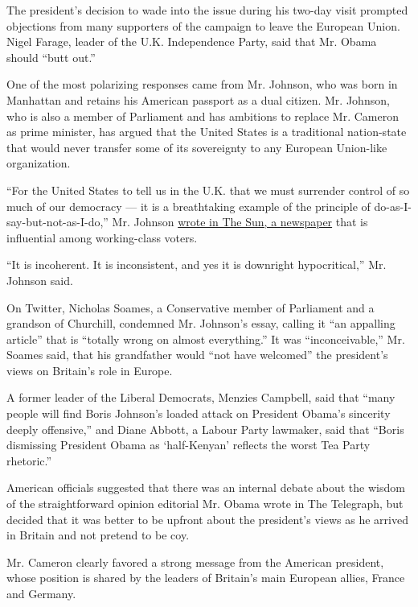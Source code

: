 The president's decision to wade into the issue during his two-day visit
prompted objections from many supporters of the campaign to leave the
European Union. Nigel Farage, leader of the U.K. Independence Party,
said that Mr. Obama should ``butt out.''

One of the most polarizing responses came from Mr. Johnson, who was born
in Manhattan and retains his American passport as a dual citizen. Mr.
Johnson, who is also a member of Parliament and has ambitions to replace
Mr. Cameron as prime minister, has argued that the United States is a
traditional nation-state that would never transfer some of its
sovereignty to any European Union-like organization.

``For the United States to tell us in the U.K. that we must surrender
control of so much of our democracy --- it is a breathtaking example of
the principle of do-as-I-say-but-not-as-I-do,'' Mr. Johnson
\href{http://www.thesun.co.uk/sol/homepage/news/politics/7095695/UK-and-America-can-better-friends-than-ever-Mr-Obama-if-we-LEAVE-the-EU-says-Boris-Johnson.html}{wrote
in The Sun, a newspaper} that is influential among working-class voters.

``It is incoherent. It is inconsistent, and yes it is downright
hypocritical,'' Mr. Johnson said.

On Twitter, Nicholas Soames, a Conservative member of Parliament and a
grandson of Churchill, condemned Mr. Johnson's essay, calling it ``an
appalling article'' that is ``totally wrong on almost everything.'' It
was ``inconceivable,'' Mr. Soames said, that his grandfather would ``not
have welcomed'' the president's views on Britain's role in Europe.

A former leader of the Liberal Democrats, Menzies Campbell, said that
``many people will find Boris Johnson's loaded attack on President
Obama's sincerity deeply offensive,'' and Diane Abbott, a Labour Party
lawmaker, said that ``Boris dismissing President Obama as `half-Kenyan'
reflects the worst Tea Party rhetoric.''

American officials suggested that there was an internal debate about the
wisdom of the straightforward opinion editorial Mr. Obama wrote in The
Telegraph, but decided that it was better to be upfront about the
president's views as he arrived in Britain and not pretend to be coy.

Mr. Cameron clearly favored a strong message from the American
president, whose position is shared by the leaders of Britain's main
European allies, France and Germany.

